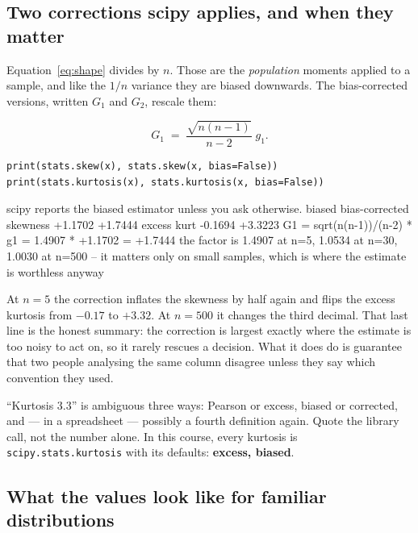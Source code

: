 \documentclass[11pt]{article}
\begin{document}
\subsection{Two corrections scipy applies, and when they matter}

Equation~\eqref{eq:shape} divides by $n$. Those are the \emph{population}
moments applied to a sample, and like the $1/n$ variance they are biased
downwards. The bias-corrected versions, written $G_1$ and $G_2$, rescale them:

\begin{equation}
  G_1 \;=\; \frac{\sqrt{n(n-1)}}{n-2}\; g_1 .
  \label{eq:G1}
\end{equation}

\begin{lstlisting}
print(stats.skew(x), stats.skew(x, bias=False))
print(stats.kurtosis(x), stats.kurtosis(x, bias=False))
\end{lstlisting}
\begin{codeout}
scipy reports the biased estimator unless you ask otherwise.
                biased     bias-corrected
skewness        +1.1702        +1.7444
excess kurt     -0.1694        +3.3223
G1 = sqrt(n(n-1))/(n-2) * g1 = 1.4907 * +1.1702 = +1.7444
the factor is 1.4907 at n=5, 1.0534 at n=30, 1.0030 at n=500 -- it matters
only on small samples, which is where the estimate is worthless anyway
\end{codeout}

At $n = 5$ the correction inflates the skewness by half again and flips the
excess kurtosis from $-0.17$ to $+3.32$. At $n = 500$ it changes the third
decimal. That last line is the honest summary: the correction is largest
exactly where the estimate is too noisy to act on, so it rarely rescues a
decision. What it does do is guarantee that two people analysing the same
column disagree unless they say which convention they used.

\begin{caution}
``Kurtosis $3.3$'' is ambiguous three ways: Pearson or excess, biased or
corrected, and --- in a spreadsheet --- possibly a fourth definition again.
Quote the library call, not the number alone. In this course, every kurtosis is
\texttt{scipy.stats.kurtosis} with its defaults: \textbf{excess, biased}.
\end{caution}

\subsection{What the values look like for familiar distributions}
\end{document}
